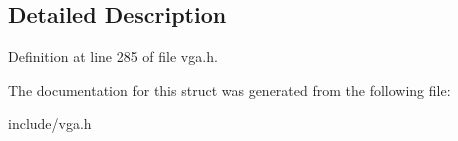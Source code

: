 \subsection{Detailed Description}


Definition at line 285 of file vga.\-h.



The documentation for this struct was generated from the following file\-:\begin{DoxyCompactItemize}
\item 
include/vga.\-h\end{DoxyCompactItemize}
